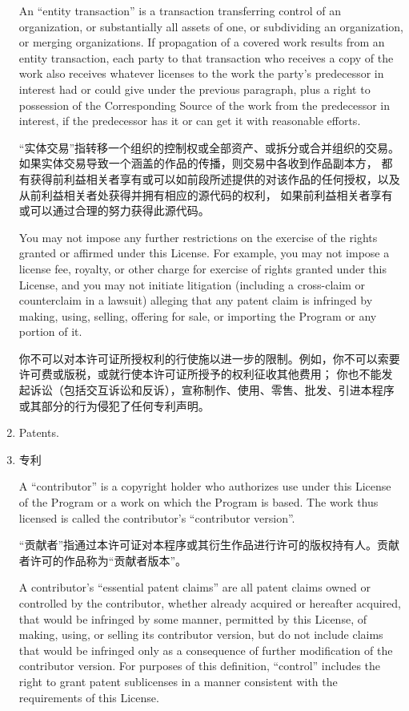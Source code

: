 \documentclass[11pt]{article}
\begin{document}
\begin{enumerate}
        An ``entity transaction'' is a transaction transferring control of an
        organization, or substantially all assets of one, or subdividing an
        organization, or merging organizations.  If propagation of a covered
        work results from an entity transaction, each party to that
        transaction who receives a copy of the work also receives whatever
        licenses to the work the party's predecessor in interest had or could
        give under the previous paragraph, plus a right to possession of the
        Corresponding Source of the work from the predecessor in interest, if
        the predecessor has it or can get it with reasonable efforts.

        “实体交易”指转移一个组织的控制权或全部资产、或拆分或合并组织的交易。如果实体交易导致一个涵盖的作品的传播，则交易中各收到作品副本方，
        都有获得前利益相关者享有或可以如前段所述提供的对该作品的任何授权，以及从前利益相关者处获得并拥有相应的源代码的权利，
        如果前利益相关者享有或可以通过合理的努力获得此源代码。

        You may not impose any further restrictions on the exercise of the
        rights granted or affirmed under this License.  For example, you may
        not impose a license fee, royalty, or other charge for exercise of
        rights granted under this License, and you may not initiate litigation
        (including a cross-claim or counterclaim in a lawsuit) alleging that
        any patent claim is infringed by making, using, selling, offering for
        sale, or importing the Program or any portion of it.

        你不可以对本许可证所授权利的行使施以进一步的限制。例如，你不可以索要许可费或版税，或就行使本许可证所授予的权利征收其他费用；
        你也不能发起诉讼（包括交互诉讼和反诉），宣称制作、使用、零售、批发、引进本程序或其部分的行为侵犯了任何专利声明。

  \item Patents.
  \item 专利

        A ``contributor'' is a copyright holder who authorizes use under this
        License of the Program or a work on which the Program is based.  The
        work thus licensed is called the contributor's ``contributor version''.

        “贡献者”指通过本许可证对本程序或其衍生作品进行许可的版权持有人。贡献者许可的作品称为“贡献者版本”。

        A contributor's ``essential patent claims'' are all patent claims
        owned or controlled by the contributor, whether already acquired or
        hereafter acquired, that would be infringed by some manner, permitted
        by this License, of making, using, or selling its contributor version,
        but do not include claims that would be infringed only as a
        consequence of further modification of the contributor version.  For
        purposes of this definition, ``control'' includes the right to grant
        patent sublicenses in a manner consistent with the requirements of
        this License.


\end{enumerate}
\end{document}
